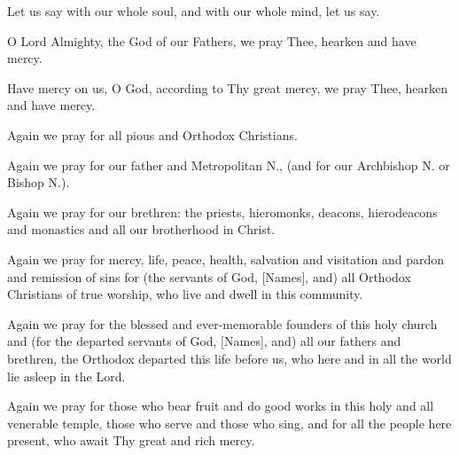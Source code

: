 \documentclass[twoside, letterpaper, 12pt]{report}
\begin{document}
\begin{deacon}
\item Let us say with our whole soul, and with our whole mind, let us say.
\end{deacon}

\begin{deacon}
\item O Lord Almighty, the God of our Fathers, we pray Thee, hearken and have mercy.
\end{deacon}

\begin{deacon}
\item Have mercy on us, O God, according to Thy great mercy, we pray Thee, hearken
    and have mercy.
\end{deacon}


\begin{deacon}
\item Again we pray for all pious and Orthodox Christians.
\item Again we pray for our father and Metropolitan N., (and for our Archbishop N. or Bishop N.).
\item Again we pray for our brethren: the priests, hieromonks, deacons, hierodeacons and monastics
    and all our brotherhood in Christ.
\item Again we pray for mercy, life, peace, health, salvation and visitation and pardon and
    remission of sins for (the servants of God, [Names], and) all Orthodox Christians of true
    worship, who live and dwell in this community.
\item Again we pray for the blessed and ever-memorable founders of this holy church and (for
    the departed servants of God, [Names], and) all our fathers and brethren, the Orthodox
    departed this life before us, who here and in all the world lie asleep in the Lord.
\item Again we pray for those who bear fruit and do good works in this holy and all venerable
    temple, those who serve and those who sing, and for all the people here present,
    who await Thy great and rich mercy.
\end{deacon}
\end{document}
